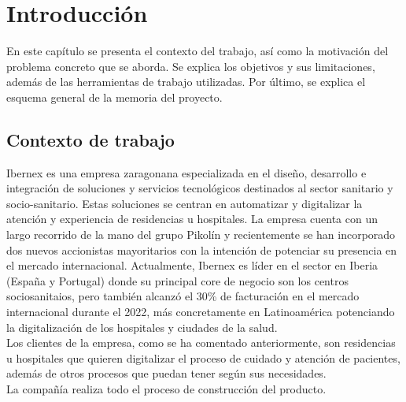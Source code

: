\chapter{Introducción}
\label{ch:no_lineal}

En este capítulo se presenta el contexto del trabajo, así como la motivación del problema concreto que se aborda. Se explica los objetivos y sus limitaciones, además de las herramientas de trabajo utilizadas. Por último, se explica el esquema general de la memoria del proyecto.

\section{Contexto de trabajo}


 Ibernex \cite{ibernex} es una empresa zaragonana especializada en el diseño, desarrollo e integración de soluciones y servicios tecnológicos destinados al sector sanitario y socio-sanitario. Estas soluciones se centran en automatizar y digitalizar la atención y experiencia de residencias u hospitales. La empresa cuenta con un largo recorrido de la mano del grupo Pikolín y recientemente se han incorporado dos nuevos accionistas mayoritarios con la intención de potenciar su presencia en el mercado internacional. Actualmente, Ibernex es líder en el sector en Iberia (España y Portugal) donde su principal core de negocio son los centros sociosanitaios, pero también alcanzó el 30\% de facturación en el mercado internacional durante el 2022, más concretamente en Latinoamérica potenciando la digitalización de los hospitales y ciudades de la salud. \\

 Los clientes de la empresa, como se ha comentado anteriormente, son residencias u hospitales que quieren digitalizar el proceso de cuidado y atención de pacientes, además de otros procesos que puedan tener según sus necesidades. \\



La compañía realiza todo el proceso de construcción del producto. \\

